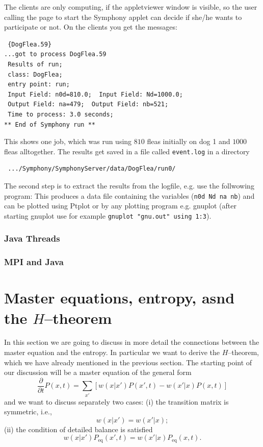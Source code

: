 The clients are only computing, if the appletviewer window is visible, so
the user calling the page to start the Symphony applet can decide if she/he
wants to participate or not. On the clients you get the messages:
\begin{verbatim}
 {DogFlea.59} 
...got to process DogFlea.59
 Results of run; 
 class: DogFlea; 
 entry point: run;  
 Input Field: n0d=810.0;  Input Field: Nd=1000.0; 
 Output Field: na=479;  Output Field: nb=521; 
 Time to process: 3.0 seconds;  
** End of Symphony run **   
\end{verbatim}
This shows one job, which was run using $810$ fleas initially on dog 1 and
$1000$ fleas alltogether. The results get saved in a file called \verb|event.log|
in a directory 
\begin{verbatim}
 .../Symphony/SymphonyServer/data/DogFlea/run0/ 
\end{verbatim}
The second step is to extract the results from the logfile, e.g. use the
follwowing program:
This produces a data file containing the variables (\verb|n0d Nd na nb|) 
and can be plotted using Ptplot or by any plotting program e.g. gnuplot (after 
starting gnuplot use for example \verb|gnuplot "gnu.out" using 1:3|).

\subsubsection{Java Threads}

\subsubsection{MPI and Java}


\section{Master equations, entropy, asnd the $H$--theorem}
In this section we are going to discuss in more detail the connections between
the master equation and the entropy. In particular we want to derive the
$H$--theorem, which we have already mentioned in the previous section. 
The starting point of our discussion will be a master equation of the general
form
\begin{equation}
\label{eq:MasterH}
  \frac{\partial}{\partial t} P(x,t) = \sum_{x'} 
   [w(x|x') P(x',t) - w(x'|x) P(x,t)]
\end{equation}
and we want to discuss separately two cases: (i) the transition matrix is
symmetric, i.e.,
\begin{displaymath}
  w(x|x') = w(x'|x);
\end{displaymath}
(ii) the condition of detailed balance is satisfied
\begin{equation}
\label{eq:MasterDetBal}
  w(x|x') P_{\textrm{eq}}(x',t) = w(x'|x) P_{\textrm{eq}}(x,t).
\end{equation}

